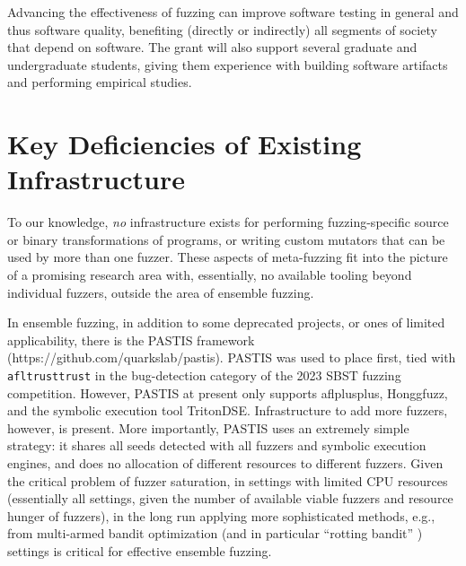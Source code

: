 \documentclass[numbers]{proposalnsf}
\begin{document}
 Advancing the effectiveness of fuzzing can improve software testing in general and
thus software quality, benefiting (directly or indirectly) all
segments of society that depend on software.  The grant
will also support several graduate and undergraduate students, giving them experience with
building software artifacts and performing empirical studies.


\section{Key Deficiencies of Existing Infrastructure}

To our knowledge, \emph{no} infrastructure exists for performing fuzzing-specific source or binary transformations of programs, or writing custom mutators that can be used by more than one fuzzer.  These aspects of meta-fuzzing fit into the picture of a promising research area with, essentially, no available tooling beyond individual fuzzers, outside the area of ensemble fuzzing.

In ensemble fuzzing, in addition to some deprecated projects, or ones of limited applicability, there is the PASTIS framework (https://github.com/quarkslab/pastis).  PASTIS was used to place first, tied with {\tt afltrusttrust} in the bug-detection category of the 2023 SBST fuzzing competition.  However, PASTIS at present only supports aflplusplus, Honggfuzz, and the symbolic execution tool TritonDSE.  Infrastructure to add more fuzzers, however, is present.  More importantly, PASTIS uses an extremely simple strategy:  it shares all seeds detected with all fuzzers and symbolic execution engines, and does no allocation of different resources to different fuzzers.  Given the critical problem of fuzzer saturation, in settings with limited CPU resources (essentially all settings, given the number of available viable fuzzers and resource hunger of fuzzers), in the long run applying more sophisticated methods, e.g., from multi-armed bandit optimization (and in particular ``rotting bandit'' \cite{}) settings is critical for effective ensemble fuzzing.
\end{document}
